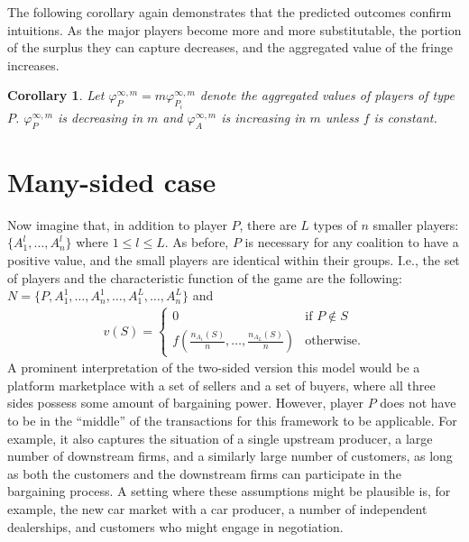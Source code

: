 \documentclass[a4paper]{article}
\newtheorem{corollary}{Corollary}
\begin{document}
The following corollary again demonstrates that the predicted outcomes confirm intuitions.
As the major players become more and more substitutable, the portion of the surplus they can capture decreases, and the aggregated value of the fringe increases.

\begin{corollary}
    \label{cor:multiple_platforms_2}
    Let $\varphi_{P}^{\infty, m} = m\varphi_{P_i}^{\infty, m}$ denote the aggregated values of players of type $P$. $\varphi_{P}^{\infty, m}$ is decreasing in $m$ and $\varphi_{A}^{\infty, m}$ is increasing in $m$ unless $f$ is constant.
\end{corollary}

\section{Many-sided case}

Now imagine that, in addition to player $P$, there are $L$ types of $n$ smaller players: $\{A^l_1, \dots, A^l_n\}$ where $1 \leq l \leq L$.
As before, $P$ is necessary for any coalition to have a positive value, and the small players are identical within their groups.
I.e., the set of players and the characteristic function of the game are the following: $N = \{P, A^1_1, \dots, A^1_n, \dots, A^L_1, \dots, A^L_n\}$ and
\begin{align*}
    v(S) = \begin{cases}
        0                                                & \text{if } P \notin S \\
        f\left(\frac{n_{A_1}(S)}{n}, \dots, \frac{n_{A_L}(S)}{n}\right) & \text{otherwise}.
    \end{cases}
\end{align*}
A prominent interpretation of the two-sided version this model would be a platform marketplace with a set of sellers and a set of buyers, where all three sides possess some amount of bargaining power.
However, player $P$ does not have to be in the ``middle'' of the transactions for this framework to be applicable.
For example, it also captures the situation of a single upstream producer, a large number of downstream firms, and a similarly large number of customers, as long as both the customers and the downstream firms can participate in the bargaining process.
A setting where these assumptions might be plausible is, for example, the new car market with a car producer, a number of independent dealerships, and customers who might engage in negotiation.
\end{document}
